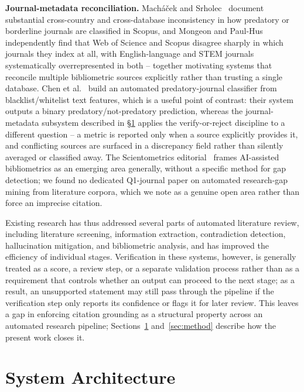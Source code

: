 \documentclass[11pt]{article}
\begin{document}
\textbf{Journal-metadata reconciliation.} Mach\'a\v{c}ek and Srholec~\cite{machacek2022predatory} document substantial cross-country and cross-database inconsistency in how predatory or borderline journals are classified in Scopus, and Mongeon and Paul-Hus~\cite{mongeon2016journal} independently find that Web of Science and Scopus disagree sharply in which journals they index at all, with English-language and STEM journals systematically overrepresented in both -- together motivating systems that reconcile multiple bibliometric sources explicitly rather than trusting a single database. Chen et al.~\cite{chen2023open} build an automated predatory-journal classifier from blacklist/whitelist text features, which is a useful point of contrast: their system outputs a binary predatory/not-predatory prediction, whereas the journal-metadata subsystem described in \S\ref{sec:architecture} applies the verify-or-reject discipline to a different question -- a metric is reported only when a source explicitly provides it, and conflicting sources are surfaced in a discrepancy field rather than silently averaged or classified away. The Scientometrics editorial~\cite{scientometrics2025editorial} frames AI-assisted bibliometrics as an emerging area generally, without a specific method for gap detection; we found no dedicated Q1-journal paper on automated research-gap mining from literature corpora, which we note as a genuine open area rather than force an imprecise citation.

Existing research has thus addressed several parts of automated literature review, including literature screening, information extraction, contradiction detection, hallucination mitigation, and bibliometric analysis, and has improved the efficiency of individual stages. Verification in these systems, however, is generally treated as a score, a review step, or a separate validation process rather than as a requirement that controls whether an output can proceed to the next stage; as a result, an unsupported statement may still pass through the pipeline if the verification step only reports its confidence or flags it for later review. This leaves a gap in enforcing citation grounding as a structural property across an automated research pipeline; Sections~\ref{sec:architecture} and~\ref{sec:method} describe how the present work closes it.

\section{System Architecture}
\label{sec:architecture}
\end{document}
